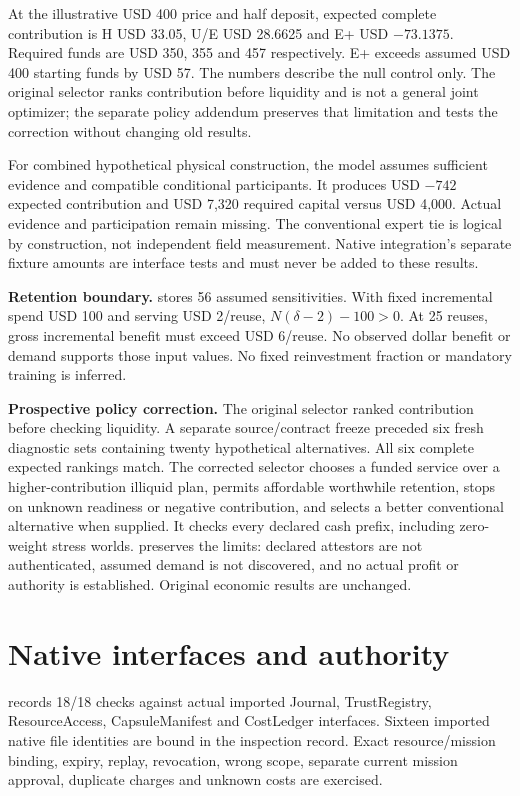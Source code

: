 \documentclass[10pt]{article}
\begin{document}
At the illustrative USD 400 price and half deposit, expected complete contribution is H USD 33.05, U/E USD 28.6625 and E+ USD $-73.1375$. Required funds are USD 350, 355 and 457 respectively. E+ exceeds assumed USD 400 starting funds by USD 57. The numbers describe the null control only. The original selector ranks contribution before liquidity and is not a general joint optimizer; the separate policy addendum preserves that limitation and tests the correction without changing old results.

For combined hypothetical physical construction, the model assumes sufficient evidence and compatible conditional participants. It produces USD $-742$ expected contribution and USD 7,320 required capital versus USD 4,000. Actual evidence and participation remain missing. The conventional expert tie is logical by construction, not independent field measurement. Native integration's separate fixture amounts are interface tests and must never be added to these results.

\textbf{Retention boundary.}  stores 56 assumed sensitivities. With fixed incremental spend USD 100 and serving USD 2/reuse, $N(\delta-2)-100>0$. At 25 reuses, gross incremental benefit must exceed USD 6/reuse. No observed dollar benefit or demand supports those input values. No fixed reinvestment fraction or mandatory training is inferred.

\textbf{Prospective policy correction.} The original selector ranked contribution before checking liquidity. A separate source/contract freeze preceded six fresh diagnostic sets containing twenty hypothetical alternatives. All six complete expected rankings match. The corrected selector chooses a funded service over a higher-contribution illiquid plan, permits affordable worthwhile retention, stops on unknown readiness or negative contribution, and selects a better conventional alternative when supplied. It checks every declared cash prefix, including zero-weight stress worlds.  preserves the limits: declared attestors are not authenticated, assumed demand is not discovered, and no actual profit or authority is established. Original economic results are unchanged.

\section{Native interfaces and authority}
 records 18/18 checks against actual imported Journal, TrustRegistry, ResourceAccess, CapsuleManifest and CostLedger interfaces. Sixteen imported native file identities are bound in the inspection record. Exact resource/mission binding, expiry, replay, revocation, wrong scope, separate current mission approval, duplicate charges and unknown costs are exercised.
\end{document}
